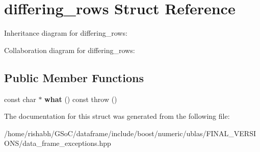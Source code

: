 \hypertarget{structdiffering__rows}{}\section{differing\+\_\+rows Struct Reference}
\label{structdiffering__rows}


Inheritance diagram for differing\+\_\+rows\+:


Collaboration diagram for differing\+\_\+rows\+:
\subsection*{Public Member Functions}
\begin{DoxyCompactItemize}
\item 
const char $\ast$ {\bfseries what} () const   throw ()\hypertarget{structdiffering__rows_a76bb856fb44461a06d49517ede1d2cf2}{}\label{structdiffering__rows_a76bb856fb44461a06d49517ede1d2cf2}

\end{DoxyCompactItemize}


The documentation for this struct was generated from the following file\+:\begin{DoxyCompactItemize}
\item 
/home/rishabh/\+G\+So\+C/dataframe/include/boost/numeric/ublas/\+F\+I\+N\+A\+L\+\_\+\+V\+E\+R\+S\+I\+O\+N\+S/data\+\_\+frame\+\_\+exceptions.\+hpp\end{DoxyCompactItemize}
